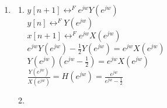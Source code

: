 \documentclass[10pt,a4paper, margin=1in]{article}
\begin{document}
\begin{enumerate}
\begin{enumerate}
\begin{center}
              \end{center}
          \end{enumerate}




    \item %
          \begin{enumerate}
              \item %
              $y[n+1] \leftrightarrow^F e^{jw}Y(e^{jw})$ \\

              $y[n] \leftrightarrow^F Y(e^{jw})$ \\

              $x[n+1] \leftrightarrow^F e^{jw}X(e^{jw})$ \\

              $e^{jw} Y(e^{jw}) - \frac{1}{2} Y(e^{jw}) = e^{jw} X(e^{jw})$\\

              $Y(e^{jw}) (e^{jw} - \frac{1}{2}) = e^{jw} X(e^{jw })$ \\

              $\frac{Y(e^{jw})}{X(e^{jw})} = H(e^{jw}) = \frac{e^{jw}}{e^{jw} - \frac{1}{2}}$ \\

              \item %
            

\end{enumerate}
\end{enumerate}
\end{document}
